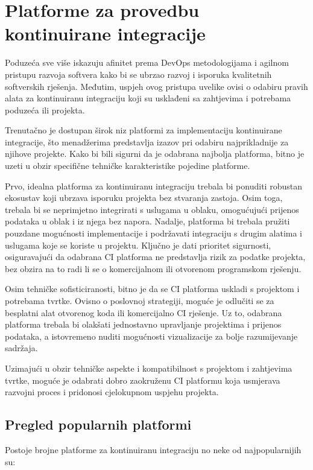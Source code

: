 \documentclass[a4paper,12pt,oneside]{article}
\begin{document}
\newpage

\section{Platforme za provedbu kontinuirane integracije}

 Poduzeća sve više iskazuju afinitet prema DevOps metodologijama i agilnom pristupu razvoja softvera kako bi se ubrzao razvoj i isporuka kvalitetnih softverskih rješenja. Međutim, uspjeh ovog pristupa uvelike ovisi o odabiru pravih alata za kontinuiranu integraciju koji su usklađeni sa zahtjevima i potrebama poduzeća ili projekta.

Trenutačno je dostupan širok niz platformi za implementaciju kontinuirane integracije, što menadžerima predstavlja izazov pri odabiru najprikladnije za njihove projekte. Kako bi bili sigurni da je odabrana najbolja platforma, bitno je uzeti u obzir specifične tehničke karakteristike pojedine platforme.

Prvo, idealna platforma za kontinuiranu integraciju trebala bi ponuditi robustan ekosustav koji ubrzava isporuku projekta bez stvaranja zastoja. Osim toga, trebala bi se neprimjetno integrirati s uslugama u oblaku, omogućujući prijenos podataka u oblak i iz njega bez napora. Nadalje, platforma bi trebala pružiti pouzdane mogućnosti implementacije i podržavati integraciju s drugim alatima i uslugama koje se koriste u projektu. Ključno je dati prioritet sigurnosti, osiguravajući da odabrana CI platforma ne predstavlja rizik za podatke projekta, bez obzira na to radi li se o komercijalnom ili otvorenom programskom rješenju.

Osim tehničke sofisticiranosti, bitno je da se CI platforma uskladi s projektom i potrebama tvrtke. Ovisno o poslovnoj strategiji, moguće je odlučiti se za besplatni alat otvorenog koda ili komercijalno CI rješenje. Uz to, odabrana platforma trebala bi olakšati jednostavno upravljanje projektima i prijenos podataka, a istovremeno nuditi mogućnosti vizualizacije za bolje razumijevanje sadržaja.

Uzimajući u obzir tehničke aspekte i kompatibilnost s projektom i zahtjevima tvrtke, moguće je odabrati dobro zaokruženu CI platformu koja usmjerava razvojni proces i pridonosi cjelokupnom uspjehu projekta.



\subsection{Pregled popularnih platformi}
Postoje brojne platforme za kontinuiranu integraciju no neke od najpopularnijih su:
\end{document}
